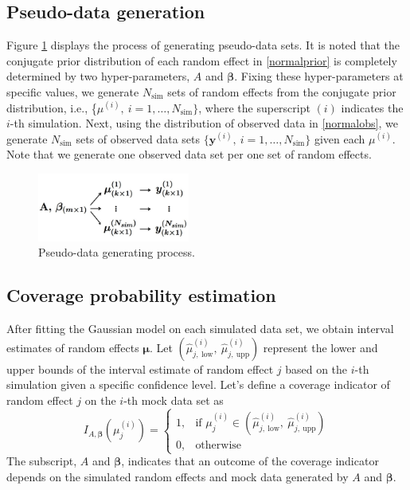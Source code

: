 \documentclass[article]{jss}
\begin{document}
\subsection{Pseudo-data generation}\label{data_generation}
Figure \ref{fig:pseudo} displays the process of generating pseudo-data sets. It is noted that  the conjugate prior distribution of each random effect in  \eqref{normalprior} is completely determined by two hyper-parameters, $A$ and $\boldsymbol{\beta}$. Fixing these hyper-parameters at specific values, we generate  $N_{\textrm{sim}}$ sets of random effects from the conjugate prior distribution, i.e., \{{\boldmath $\mu$}$^{(i)},~i=1, \ldots, N_{\textrm{sim}}\}$, where the superscript $(i)$ indicates the $i$-th simulation. Next, using the distribution of observed data in  \eqref{normalobs}, we generate $N_{\textrm{sim}}$ sets of observed data sets $\{\boldsymbol{y}^{(i)},~i=1, \ldots, N_{\textrm{sim}}\}$ given each {\boldmath$\mu$}$^{(i)}$. Note that we generate one observed data set per one set of random effects.

\begin{figure}[b!]
\begin{center}
\includegraphics[width=5cm]{process.png}
\caption{Pseudo-data generating process.}
\label{fig:pseudo}
\end{center}
\end{figure}



\subsection{Coverage probability estimation}
After fitting the Gaussian model on each simulated data set, we obtain interval estimates of random effects $\boldsymbol{\mu}$. Let $(\hat{\mu}^{(i)}_{j, ~\textrm{low}}, ~\hat{\mu}^{(i)}_{j, ~\textrm{upp}})$ represent the lower and upper bounds of the interval estimate of random effect $j$ based on the $i$-th simulation given a specific confidence level.  Let's define a coverage indicator of random effect $j$ on the $i$-th mock data set as 
\begin{equation}\label{coverage_indicator}
I_{A, \boldsymbol{\beta}}(\mu_j^{(i)}) = \left\{ \begin{array}{ll}
1, & \textrm{if $\mu_j^{(i)}\in(\hat{\mu}^{(i)}_{j, ~\textrm{low}}, ~\hat{\mu}^{(i)}_{j, ~\textrm{upp}})$}\\
0, & \textrm{otherwise}
\end{array} \right.
\end{equation}
The subscript, $A$ and $\boldsymbol{\beta}$, indicates that an outcome of the coverage indicator depends on the simulated random effects and mock data generated by $A$ and $\boldsymbol{\beta}$. 
\end{document}
